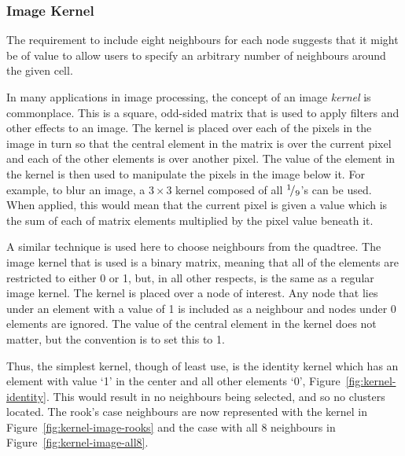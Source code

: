 \subsubsection{Image Kernel}
\label{ssub:Image Kernel}

The requirement to include eight neighbours for each node suggests that it
might be of value to allow users to specify an arbitrary number of neighbours
around the given cell.

In many applications in image processing, the concept of an image \emph{kernel}
is commonplace. This is a square, odd-sided matrix that is used to apply
filters and other effects to an image. The kernel is placed over each of the
pixels in the image in turn so that the central element in the matrix is over
the current pixel and each of the other elements is over another pixel. The
value of the element in the kernel is then used to manipulate the pixels in the
image below it. For example, to blur an image, a $3\times 3$ kernel composed of
all ${}^{1}\!/_{9}$'s can be used. When applied, this would mean that the
current pixel is given a value which is the sum of each of matrix elements
multiplied by the pixel value beneath it.

A similar technique is used here to choose neighbours from the quadtree. The
image kernel that is used is a binary matrix, meaning that all of the elements
are restricted to either 0 or 1, but, in all other respects, is the same as a
regular image kernel. The kernel is placed over a node of interest. Any node
that lies under an element with a value of 1 is included as a neighbour and
nodes under 0 elements are ignored. The value of the central element in the
kernel does not matter, but the convention is to set this to 1.

Thus, the simplest kernel, though of least use, is the identity kernel which
has an element with value `1' in the center and all other elements `0',
Figure~\ref{fig:kernel-identity}. This would result in no neighbours being
selected, and so no clusters located. The rook's case neighbours are now
represented with the kernel in Figure~\ref{fig:kernel-image-rooks} and the case
with all 8 neighbours in Figure~\ref{fig:kernel-image-all8}.


